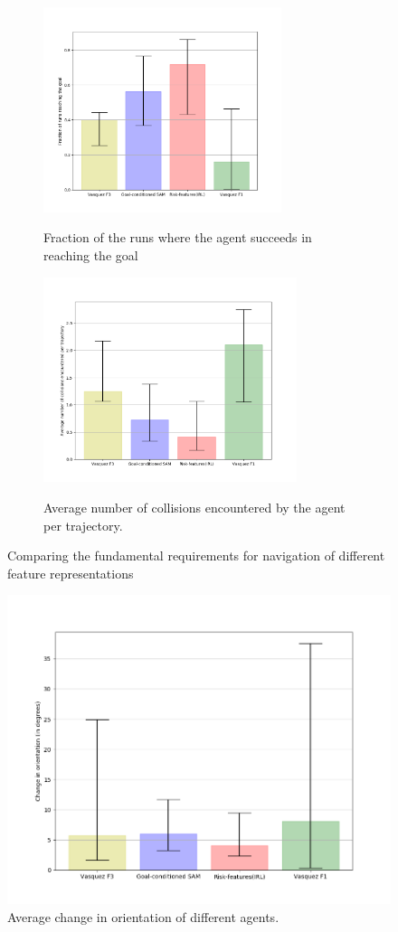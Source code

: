 \begin{figure}[!htbp]
	\begin{subfigure}{.5\textwidth}
		\centering
		\includegraphics[width=\linewidth, height=6cm]{plots/ucy_inter_irl_new/goal_reached_ucy_inter_irl.png}
		\label{fig:inter_IRL-goal_reached}
		\caption{Fraction of the runs where the agent succeeds in reaching the goal}
	\end{subfigure}
	\begin{subfigure}{.5\textwidth}
		\centering
		\includegraphics[width=\linewidth, height=6cm]{plots/ucy_inter_irl_new/count_collisions_ucy_inter_irl.png}
		\label{fig:inter_IRL-collision_counts}
		\caption{Average number of collisions encountered by the agent per trajectory.}
	\end{subfigure}
	\caption{Comparing the fundamental requirements for navigation of different feature representations }
\end{figure}

\begin{figure}[htbp]
	\centering
	\includegraphics[width=0.7\linewidth]{plots/ucy_inter_irl_new/compute_trajectory_smoothness_ucy_inter_irl.png}
	\caption{Average change in orientation of different agents.}
	\label{fig:inter_IRL-change_in_orientation_avg}
\end{figure}

